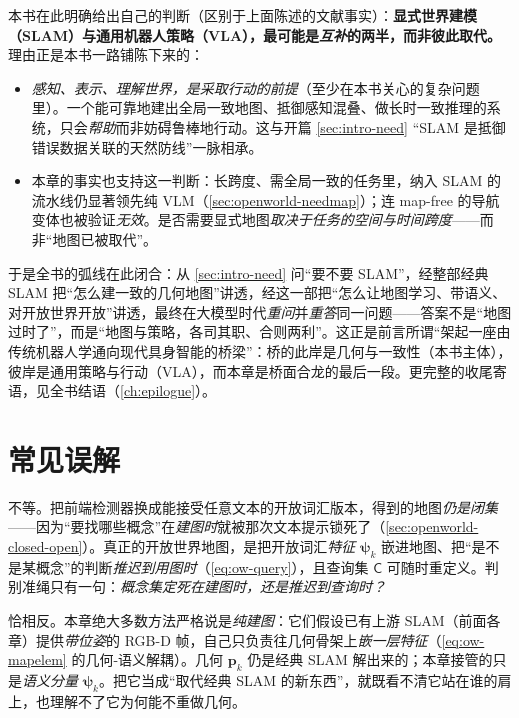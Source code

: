 \begin{insight}
本书在此明确给出自己的判断（区别于上面陈述的文献事实）：\textbf{显式世界建模（SLAM）与通用机器人策略（VLA），最可能是\emph{互补}的两半，而非彼此取代。}理由正是本书一路铺陈下来的：
\begin{itemize}
  \item \emph{感知、表示、理解世界，是采取行动的前提}（至少在本书关心的复杂问题里）。一个能可靠地建出全局一致地图、抵御感知混叠、做长时一致推理的系统，只会\emph{帮助}而非妨碍鲁棒地行动。这与开篇 \cref{sec:intro-need} “SLAM 是抵御错误数据关联的天然防线”一脉相承。
  \item 本章的事实也支持这一判断：长跨度、需全局一致的任务里，纳入 SLAM 的流水线仍显著领先纯 VLM（\cref{sec:openworld-needmap}）；连 map-free 的导航变体也被验证\emph{无效}。是否需要显式地图\emph{取决于任务的空间与时间跨度}——而非“地图已被取代”。
\end{itemize}
\noindent 于是全书的弧线在此闭合：从 \cref{sec:intro-need} 问“要不要 SLAM”，经整部经典 SLAM 把“怎么建一致的几何地图”讲透，经这一部把“怎么让地图学习、带语义、对开放世界开放”讲透，最终在大模型时代\emph{重问}并\emph{重答}同一问题——答案不是“地图过时了”，而是“地图与策略，各司其职、合则两利”。这正是前言所谓“架起一座由传统机器人学通向现代具身智能的桥梁”：桥的此岸是几何与一致性（本书主体），彼岸是通用策略与行动（VLA），而本章是桥面合龙的最后一段。更完整的收尾寄语，见全书结语（\cref{ch:epilogue}）。
\end{insight}

\section*{常见误解}

\begin{pitfall}
不等。把前端检测器换成能接受任意文本的开放词汇版本，得到的地图\emph{仍是闭集}——因为“要找哪些概念”在\emph{建图时}就被那次文本提示锁死了（\cref{sec:openworld-closed-open}）。真正的开放世界地图，是把开放词汇\emph{特征} $\boldsymbol\psi_k$ 嵌进地图、把“是不是某概念”的判断\emph{推迟到用图时}（\cref{eq:ow-query}），且查询集 $\mathsf{C}$ 可随时重定义。判别准绳只有一句：\emph{概念集定死在建图时，还是推迟到查询时？}
\end{pitfall}

\begin{pitfall}
恰相反。本章绝大多数方法严格说是\emph{纯建图}：它们假设已有上游 SLAM（前面各章）提供\emph{带位姿}的 RGB-D 帧，自己只负责往几何骨架上\emph{嵌一层特征}（\cref{eq:ow-mapelem} 的几何-语义解耦）。几何 $\mathbf{p}_k$ 仍是经典 SLAM 解出来的；本章接管的只是\emph{语义分量} $\boldsymbol\psi_k$。把它当成“取代经典 SLAM 的新东西”，就既看不清它站在谁的肩上，也理解不了它为何能不重做几何。
\end{pitfall}


